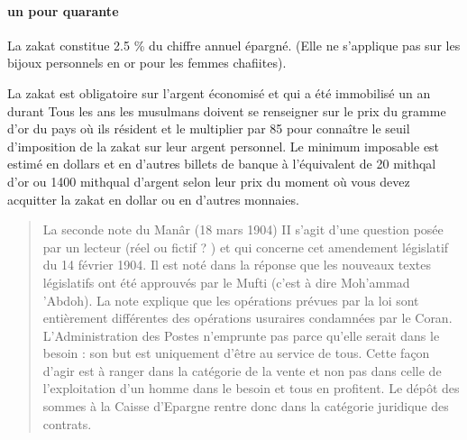 \paragraph{un pour quarante}
 La zakat constitue 2.5 \% du chiffre annuel épargné. (Elle ne s'applique pas sur les bijoux personnels en or pour les femmes chafiites).

La zakat est obligatoire sur l'argent économisé et qui a été immobilisé un an durant  
 Tous les ans les musulmans doivent se renseigner sur le prix du gramme d'or du pays où ils résident et le multiplier par 85 pour connaître le seuil d'imposition de la zakat sur leur argent personnel. Le minimum imposable est estimé en dollars et en d’autres billets de banque à l’équivalent de 20 mithqal d’or ou 1400 mithqual d’argent selon leur prix du moment où vous devez acquitter la zakat en dollar ou en d’autres monnaies.
 
 \begin{quote}
     La seconde note du Manâr (18 mars 1904)
II s'agit d'une question posée par un lecteur (réel ou fictif ? ) et qui concerne
cet amendement législatif du 14 février 1904. Il est noté dans la réponse que les
nouveaux textes législatifs ont été approuvés par le Mufti (c'est à dire Moh'ammad
'Abdoh). La note explique que les opérations prévues par la loi sont entièrement
différentes des opérations usuraires condamnées par le Coran. L'Administration
des Postes n'emprunte pas parce qu'elle serait dans le besoin : son but est
uniquement d'être au service de tous. Cette façon d'agir est à ranger dans la
catégorie de la vente et non pas dans celle de l'exploitation d'un homme dans le
besoin et tous en profitent. Le dépôt des sommes à la Caisse d'Epargne rentre
donc dans la catégorie juridique des contrats.
 \end{quote}
 
